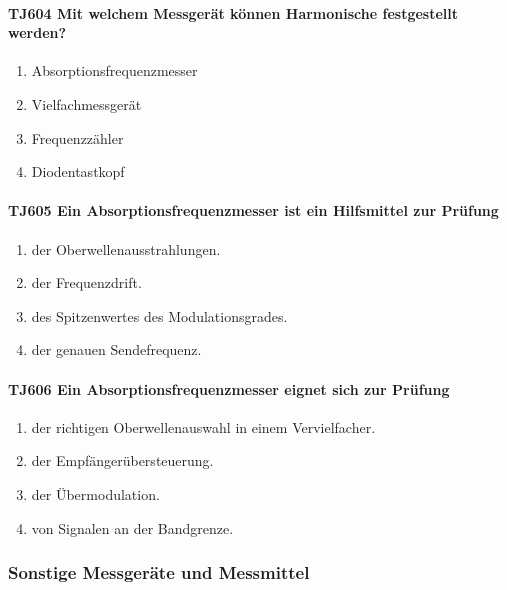 \documentclass[8pt]{article}
\begin{document}
\paragraph*{TJ604 Mit welchem Messgerät können Harmonische festgestellt werden?}
\begin{enumerate}[nolistsep,label=\Alph*]
\item Absorptionsfrequenzmesser
\item Vielfachmessgerät
\item Frequenzzähler
\item Diodentastkopf
\end{enumerate}

\paragraph*{TJ605 Ein Absorptionsfrequenzmesser ist ein Hilfsmittel zur Prüfung} 
\begin{enumerate}[nolistsep,label=\Alph*]
\item der Oberwellenausstrahlungen.
\item der Frequenzdrift.
\item des Spitzenwertes des Modulationsgrades.
\item der genauen Sendefrequenz.
\end{enumerate}

\paragraph*{TJ606 Ein Absorptionsfrequenzmesser eignet sich zur Prüfung}
\begin{enumerate}[nolistsep,label=\Alph*]
\item der richtigen Oberwellenauswahl in einem Vervielfacher.
\item der Empfängerübersteuerung.
\item der Übermodulation.
\item von Signalen an der Bandgrenze.
\end{enumerate}

\pagebreak
\subsubsection{Sonstige Messgeräte und Messmittel}
\end{document}
